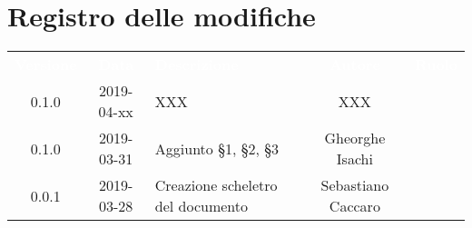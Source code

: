 \section*{Registro delle modifiche}
{
	\renewcommand{\arraystretch}{1.5}
	\centering
	\begin{longtable}{ c c C{6cm} c c }
		\textcolor{white}{\textbf{Versione}} & \textcolor{white}{\textbf{Data}} & \textcolor{white}{\textbf{Descrizione}} & \textcolor{white}{\textbf{Autore}} & \textcolor{white}{\textbf{Ruolo}}\\
			
		0.1.0 & 2019-04-xx & XXX & XXX & \ver{} \\ 
		
		0.1.0 & 2019-03-31 & Aggiunto \S1, \S2, \S3 & Gheorghe Isachi & \reda{} \\
		
		0.0.1 & 2019-03-28 & Creazione scheletro del documento & Sebastiano Caccaro & \reda{}
		
	\end{longtable}

}